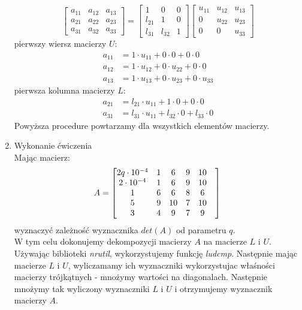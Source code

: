 \documentclass[12pt,a4paper]{article}
\begin{document}
\begin{enumerate}
\begin{equation}
\begin{bmatrix}
a_{11}&a_{12}&a_{13}\\
a_{21}&a_{22}&a_{23}\\
a_{31}&a_{32}&a_{33}
\end{bmatrix}=
\begin{bmatrix}
1&0&0\\
l_{21}&1&0\\
l_{31}&l_{32}&1
\end{bmatrix}
\begin{bmatrix}
u_{11}&u_{12}&u_{13}\\
0&u_{22}&u_{23}\\
0&0&u_{33}
\end{bmatrix}
\end{equation}
pierwszy wiersz macierzy $U$:
\begin{align}
\nonumber a_{11}&=1\cdot u_{11}+0\cdot 0+0\cdot 0\\
\nonumber a_{12}&=1\cdot u_{12}+0\cdot u_{22}+0\cdot 0\\
\nonumber a_{13}&=1\cdot u_{13}+0\cdot u_{23}+0\cdot u_{33}
\end{align}
pierwsza kolumna macierzy $L$:
\begin{align}
\nonumber a_{21}&=l_{21}\cdot u_{11}+1\cdot 0+ 0\cdot 0\\
\nonumber a_{31}&=l_{31}\cdot u_{11}+l_{32}\cdot 0+l_{33}\cdot 0
\end{align}
Powyższa procedure powtarzamy dla wszystkich elementów macierzy.
\item Wykonanie ćwiczenia\\
Mając macierz:
\begin{equation}
A=\begin{bmatrix}
2q\cdot 10^{-4}&1&6&9&10\\
2\cdot 10^{-4}&1&6&9&10\\
1&6&6&8&6\\
5&9&10&7&10\\
3&4&9&7&9&
\end{bmatrix}\\
\end{equation}
wyznaczyć zależność wyznacznika $det(A)$ od parametru $q$.\\
W tym celu dokonujemy dekompozycji macierzy $A$ na macierze $L$ i $U$. Używając biblioteki \textit{nrutil}, wykorzystujemy funkcję \textit{ludcmp}. Następnie mając macierze $L$ i $U$, wyliczamamy ich wyznaczniki wykorzystujac właśności macierzy trójkątnych - mnożymy wartości na diagonalach. Następnie mnożymy tak wyliczony wyznaczniki $L$ i $U$ i otrzymujemy wyznacznik macierzy $A$.\\

\end{enumerate}
\end{document}
